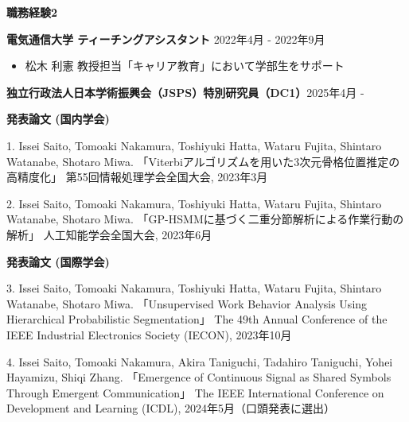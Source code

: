 \documentclass[a4paper,10pt]{article}
\begin{document}
\noindent
\begin{minipage}[t]{0.3\textwidth}
    \textbf{職務経験2}
\end{minipage}%
\begin{minipage}[t]{0.7\textwidth}
    \textbf{電気通信大学 ティーチングアシスタント} \hfill 2022年4月 - 2022年9月
      \begin{itemize}
    \item 松木 利憲 教授担当「キャリア教育」において学部生をサポート \newline
      \end{itemize}
    
    \textbf{ 独立行政法人日本学術振興会（JSPS）特別研究員（DC1）}\hfill 2025年4月 - \newline
    
\end{minipage}

\vspace{10pt}

\noindent
\begin{minipage}[t]{0.3\textwidth}
    \textbf{発表論文 (国内学会)}
\end{minipage}%
\begin{minipage}[t]{0.7\textwidth}
    1. Issei Saito, Tomoaki Nakamura, Toshiyuki Hatta, Wataru Fujita, Shintaro Watanabe, Shotaro Miwa.  
       「Viterbiアルゴリズムを用いた3次元骨格位置推定の高精度化」  
       第55回情報処理学会全国大会, 2023年3月 \newline

    2. Issei Saito, Tomoaki Nakamura, Toshiyuki Hatta, Wataru Fujita, Shintaro Watanabe, Shotaro Miwa.  
       「GP-HSMMに基づく二重分節解析による作業行動の解析」  
       人工知能学会全国大会, 2023年6月
\end{minipage}

\vspace{10pt}

\noindent
\begin{minipage}[t]{0.3\textwidth}
    \textbf{発表論文 (国際学会)}
\end{minipage}%
\begin{minipage}[t]{0.7\textwidth}
    3. Issei Saito, Tomoaki Nakamura, Toshiyuki Hatta, Wataru Fujita, Shintaro Watanabe, Shotaro Miwa.  
       「Unsupervised Work Behavior Analysis Using Hierarchical Probabilistic Segmentation」  
       The 49th Annual Conference of the IEEE Industrial Electronics Society (IECON), 2023年10月 \newline
       
    4. Issei Saito, Tomoaki Nakamura, Akira Taniguchi, Tadahiro Taniguchi, Yohei Hayamizu, Shiqi Zhang. 
    「Emergence of Continuous Signal as Shared Symbols Through Emergent Communication」  
       The IEEE International Conference on Development and Learning (ICDL), 2024年5月（口頭発表に選出）
\end{minipage}
\end{document}
